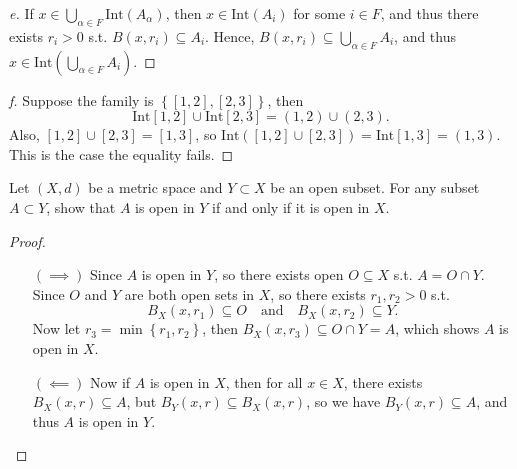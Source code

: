 \begin{proof}[e]
  If \(x \in \bigcup_{\alpha \in F} \mathrm{Int}(A_\alpha )  \), then \(x \in \mathrm{Int}(A_i) \) for some \(i \in F\), and thus there exists \(r_i > 0\) s.t. \(B(x, r_i) \subseteq A_i\). Hence, \(B(x, r_i) \subseteq \bigcup_{\alpha \in F} A_i \), and thus \(x \in \mathrm{Int}\left( \bigcup_{\alpha \in F}A_i  \right)  \).       
\end{proof}
\begin{proof}[f]
  Suppose the family is \(\left\{ [1, 2], [2, 3] \right\} \), then 
  \[
    \mathrm{Int}[1, 2] \cup \mathrm{Int}[2, 3] = (1, 2) \cup (2, 3).  
  \]
  Also, \([1, 2] \cup [2, 3] = [1, 3]\), so \(\mathrm{Int}\left( [1,2] \cup [2, 3] \right) = \mathrm{Int}[1, 3] = (1, 3)   \). This is the case the equality fails. 
\end{proof}

\begin{problem}
    Let $(X, d)$ be a metric space and $Y \subset X$ be an open subset. For any subset $A \subset Y$, show
that $A$ is open in $Y$ if and only if it is open in $X$.
\end{problem}
\begin{proof}
  \vphantom{text}
  \begin{itemize}
    \item [\((\implies )\)] Since \(A\) is open in \(Y\), so there exists open \(O \subseteq X\) s.t. \(A = O \cap Y\). Since \(O\) and \(Y\) are both open sets in \(X\), so there exists \(r_1, r_2 > 0\) s.t. 
    \[
      B_X (x, r_1) \subseteq O \quad \text{and} \quad B_X(x, r_2) \subseteq Y.
    \]
    Now let \(r_3 = \min \left\{ r_1, r_2  \right\} \), then \(B_X(x, r_3) \subseteq O \cap Y = A\), which shows \(A\) is open in \(X\). 
    \item [\((\impliedby )\)]  Now if \(A\) is open in \(X\), then for all \(x \in X\), there exists \(B_X(x, r) \subseteq A\), but \(B_Y (x, r) \subseteq B_X(x, r)\), so we have \(B_Y(x, r) \subseteq A\), and thus \(A\) is open in \(Y\).                     
  \end{itemize}
\end{proof}

